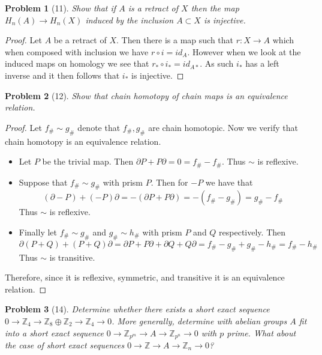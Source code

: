 \documentclass[10pt]{article}
\newcommand{\sk}{\vskip 2mm}
\theoremstyle{plain}
\newtheorem{problem}{Problem}
\theoremstyle{remark}
\begin{document}
\begin{problem}[11]
  Show that if $A$ is a retract of $X$ then the map
  $H_n(A) \to H_n(X)$ induced by the inclusion $A \subset X$
  is injective.
\end{problem}

\begin{proof}
  Let $A$ be a retract of $X$. Then there is a map such that
  $r:X\rightarrow A$ which when composed with inclusion we have
  $r\circ i= id_A$. However when we look at the induced maps on
  homology we see that $r_*\circ i_*=id_{A*}$. As such $i_*$ has
  a left inverse and it then follows that $i_*$ is injective.
\end{proof}

\sk

\begin{problem}[12]
  Show that chain homotopy of chain maps is an equivalence relation.
\end{problem}

\begin{proof}
  Let $f_\#\sim g_\#$ denote that $f_\#,g_\#$ are chain homotopic. Now we verify
  that chain homotopy is an equivalence relation.

  \begin{itemize}
  \item
    Let $P$ be the trivial map. Then $\partial P + P\partial=0=f_\#-f_\#$. Thus
    $\sim$ is reflexive.
  \item
    Suppose that $f_\#\sim g_\#$ with prism $P$. Then for $-P$ we
    have that
    \[(\partial -P)+(-P)\partial = -(\partial P+P\partial)=-(f_\#-g_\#)=g_\#-f_\#\]
    Thus $\sim$ is reflexive.
  \item
    Finally let $f_\#\sim g_\#$ and $g_\#\sim h_\#$ with prism $P$ and $Q$ respectively.
    Then
    \[ \partial(P+Q) +(P+Q)\partial = \partial P + P\partial+\partial Q + Q\partial=f_\#-g_\#+g_\#-h_\#=f_\#-h_\# \]
    Thus $\sim$ is transitive.
  \end{itemize}

  Therefore, since it is reflexive, symmetric, and transitive it is an equivalence relation.
\end{proof}

\sk

\begin{problem}[14]
  Determine whether there exists a short exact sequence
  $0 \to \mathbb{Z}_4 \to \mathbb{Z}_8 \oplus \mathbb{Z}_2 \to \mathbb{Z}_4 \to 0$.
  More generally, determine with abelian groups $A$ fit into a short
  exact sequence $0 \to \mathbb{Z}_{p^m} \to A \to \mathbb{Z}_{p^n} \to 0$ with
  $p$ prime. What about the case of short exact sequences
  $0 \to \mathbb{Z} \to A \to \mathbb{Z}_n \to 0$?
\end{problem}
\end{document}
